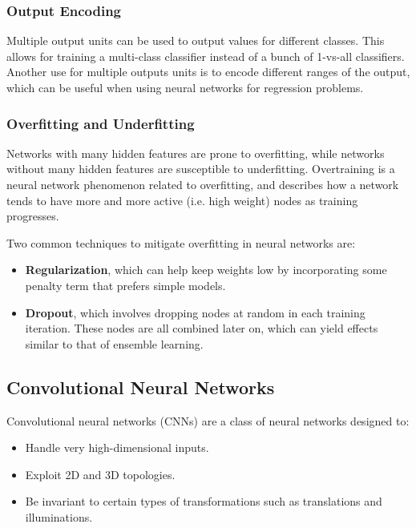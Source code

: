 \documentclass[12pt,titlepage]{article}
\begin{document}
      \subsubsection{Output Encoding}
        Multiple output units can be used to output values for different classes. This allows for training a multi-class classifier instead of a bunch of 1-vs-all classifiers.
        Another use for multiple outputs units is to encode different ranges of the output, which can be useful when using neural networks for regression problems.

      \subsubsection{Overfitting and Underfitting}
        Networks with many hidden features are prone to overfitting, while networks without many hidden features are susceptible to underfitting. Overtraining is a neural
        network phenomenon related to overfitting, and describes how a network tends to have more and more active (i.e. high weight) nodes as training progresses.

        Two common techniques to mitigate overfitting in neural networks are:
        \begin{itemize}
          \item \textbf{Regularization}, which can help keep weights low by incorporating some penalty term that prefers simple models.
          \item \textbf{Dropout}, which involves dropping nodes at random in each training iteration. These nodes are all combined later on, which can yield effects
            similar to that of ensemble learning.
        \end{itemize}

    \subsection{Convolutional Neural Networks}
      Convolutional neural networks (CNNs) are a class of neural networks designed to:
      \begin{itemize}
        \item Handle very high-dimensional inputs.
        \item Exploit 2D and 3D topologies.
        \item Be invariant to certain types of transformations such as translations and illuminations.
      \end{itemize}
\end{document}
